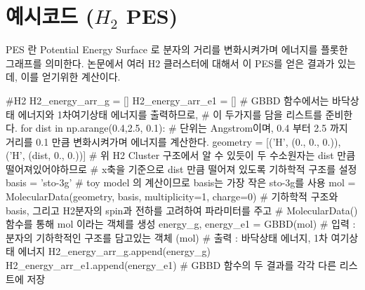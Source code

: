 \documentclass[11pt]{article}
\begin{document}
\section{예시코드 ($H_2$ PES)}
PES 란 Potential Energy Surface 로 분자의 거리를 변화시켜가며 에너지를 플롯한 그래프를 의미한다. 
논문에서 여러 H2 클러스터에 대해서 이 PES를 얻은 결과가 있는데, 이를 얻기위한 계산이다. 
\begin{CodeBox}[title={Example: Python snippet}]
#H2
H2_energy_arr_g = []
H2_energy_arr_e1 = []
# GBBD 함수에서는 바닥상태 에너지와 1차여기상태 에너지를 출력하므로, 
# 이 두가지를 담을 리스트를 준비한다. 
for dist in np.arange(0.4,2.5, 0.1):
# 단위는 Angstrom이며, 0.4 부터 2.5 까지 거리를 0.1 만큼 변화시켜가며 에너지를 계산한다. 
    geometry = [('H', (0., 0., 0.)),
                ('H', (dist, 0., 0.))]
    # 위 H2 Cluster 구조에서 알 수 있듯이 두 수소원자는 dist 만큼 떨어져있어야하므로
    # x축을 기준으로 dist 만큼 떨어져 있도록 기하학적 구조를 설정
    basis = 'sto-3g'
    # toy model 의 계산이므로 basis는 가장 작은 sto-3g를 사용 
    mol = MolecularData(geometry, basis, multiplicity=1, charge=0)
    # 기하학적 구조와 basis, 그리고 H2분자의 spin과 전하를 고려하여 파라미터를 주고 
    # MolecularData() 함수를 통해 mol 이라는 객체를 생성
    energy_g, energy_e1 = GBBD(mol)
    # 입력 : 분자의 기하학적인 구조를 담고있는 객체 (mol)
    # 출력 : 바닥상태 에너지, 1차 여기상태 에너지 
    H2_energy_arr_g.append(energy_g)
    H2_energy_arr_e1.append(energy_e1)
    # GBBD 함수의 두 결과를 각각 다른 리스트에 저장

\end{CodeBox}
\end{document}
